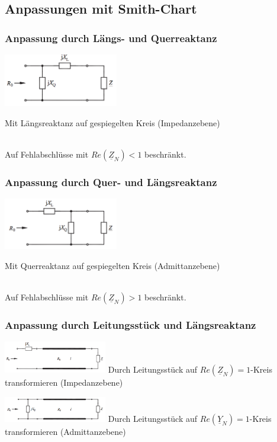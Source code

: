 	\subsection{Anpassungen mit Smith-Chart}
	\begin{multicols}{2}
		\subsubsection{Anpassung durch Längs- und Querreaktanz}
			\parbox[c]{5cm}{\includegraphics[width = 5cm]{./bilder/Anp_Laengs_Querreaktanz}} \parbox[c]{4cm}{Mit Längsreaktanz auf gespiegelten Kreis (Impedanzebene)}\\
			Auf Fehlabschlüsse mit $Re(\underline{Z}_N)<1$ beschränkt.
		\subsubsection{Anpassung durch Quer- und Längsreaktanz}
			\parbox[c]{5cm}{\includegraphics[width = 5cm]{./bilder/Anp_Quer_Laengsreaktanz}}
			\parbox[c]{4cm}{Mit Querreaktanz auf gespiegelten Kreis (Admittanzebene)}\\
			Auf Fehlabschlüsse mit $Re(\underline{Z}_N)>1$ beschränkt.
			\columnbreak
		\subsubsection{Anpassung durch Leitungsstück und Längsreaktanz}
			\parbox[c]{4.5cm}{\includegraphics[width = 4.5cm]{./bilder/Anp_Leitung_Laengsreaktanz}
			Durch Leitungsstück auf $Re(\underline{Z}_N)=1$-Kreis transformieren (Impedanzebene)} \hspace{0.5cm}
			\parbox[c]{4.5cm}{\includegraphics[width = 4.5cm]{./bilder/Anp_Leitung_Querreaktanz}
			Durch Leitungsstück auf $Re(\underline{Y}_N)=1$-Kreis transformieren (Admittanzebene)}

\end{multicols}
